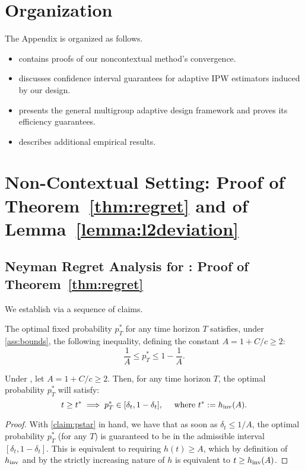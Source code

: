 \appendix

\clearpage

\section*{Organization}

The Appendix is organized as follows.


\begin{itemize}
    \item {} contains proofs of our noncontextual method's convergence.
    \item {} discusses confidence interval guarantees for adaptive IPW estimators induced by our design.
    \item {} presents the general multigroup adaptive design framework and proves its efficiency guarantees.
    \item {} describes additional empirical results. 
\end{itemize}



\section{Non-Contextual Setting: Proof of Theorem~\ref{thm:regret} and of Lemma~\ref{lemma:l2deviation}}\label{app:proof-noncontextual}

\subsection{Neyman Regret Analysis for \ClipOGDSC: Proof of Theorem~\ref{thm:regret}}

We establish  via a sequence of claims.

\begin{claim} \label{claim:pstar}
    The optimal fixed probability $p^*_T$ for any time horizon $T$ satisfies, under \cref{ass:bounds}, the following inequality, defining the constant $A = 1 + C/ c \geq 2$:
    \[
    \frac{1}{A} \leq p^*_T \leq 1 - \frac{1}{A}.
    \]
\end{claim}

\begin{claim} \label{claim:pstartime}
    Under , let $A = 1 + C/ c \geq 2$. Then, for any time horizon $T$, the optimal probability $p^*_T$ will satisfy:
    \[
    t \geq t^* \implies p^*_T \in [\delta_t, 1-\delta_t], \quad \text{ where } t^* := h_\mathrm{inv}(A).
    \]
\end{claim}
\begin{proof}
    With \ref{claim:pstar} in hand, we have that as soon as $\delta_t \leq 1/A$, the optimal probability $p^*_T$ (for any $T$) is guaranteed to be in the admissible interval $[\delta_t, 1-\delta_t]$. This is equivalent to requiring $h(t) \geq A$, which by definition of $h_\mathrm{inv}$ and by the strictly increasing nature of $h$ is equivalent to $t \geq h_\mathrm{inv}(A)$.
\end{proof}


